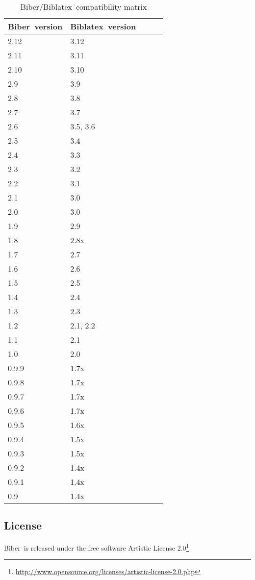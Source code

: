\documentclass{ltxdockit}
\newcommand*{\biber}{Biber\xspace}
\newcommand*{\biblatex}{Biblatex\xspace}
\begin{document}
\begin{table}
\begin{center}
\small
\begin{tabular}{lllll}
\toprule
\biber\ version & \biblatex\ version\\
\midrule
2.12 & 3.12\\
2.11 & 3.11\\
2.10 & 3.10\\
2.9 & 3.9\\
2.8 & 3.8\\
2.7 & 3.7\\
2.6 & 3.5, 3.6\\
2.5 & 3.4\\
2.4 & 3.3\\
2.3 & 3.2\\
2.2 & 3.1\\
2.1 & 3.0\\
2.0 & 3.0\\
1.9 & 2.9\\
1.8 & 2.8x\\
1.7 & 2.7\\
1.6 & 2.6\\
1.5 & 2.5\\
1.4 & 2.4\\
1.3 & 2.3\\
1.2 & 2.1, 2.2\\
1.1 & 2.1\\
1.0 & 2.0\\
0.9.9 & 1.7x\\
0.9.8 & 1.7x\\
0.9.7 & 1.7x\\
0.9.6 & 1.7x\\
0.9.5 & 1.6x\\
0.9.4 & 1.5x\\
0.9.3 & 1.5x\\
0.9.2 & 1.4x\\
0.9.1 & 1.4x\\
0.9 & 1.4x\\
\bottomrule
\end{tabular}
\end{center}
\caption{\biber/\biblatex\ compatibility matrix}
\label{tab:compat}
\end{table}

\subsection{License}

\biber\ is released under the free software Artistic License 2.0\footnote{\url{http://www.opensource.org/licenses/artistic-license-2.0.php}}
\end{document}
